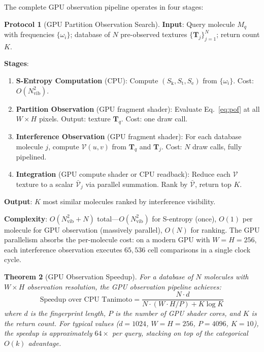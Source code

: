 \documentclass[11pt,twocolumn,a4paper]{article}
\newtheorem{theorem}{Theorem}[section]
\theoremstyle{definition}
\newtheorem{protocol}[theorem]{Protocol}
\theoremstyle{remark}
\newcommand{\Sk}{S_{\mathrm{k}}}
\newcommand{\St}{S_{\mathrm{t}}}
\newcommand{\Se}{S_{\mathrm{e}}}
\newcommand{\Nvib}{N_{\mathrm{vib}}}
\begin{document}
The complete GPU observation pipeline operates in four stages:

\begin{protocol}[GPU Partition Observation Search]
\label{prot:gpu_search}
\textbf{Input}: Query molecule $M_q$ with frequencies $\{\omega_i\}$; database of $N$ pre-observed textures $\{\mathbf{T}_j\}_{j=1}^N$; return count $K$.

\textbf{Stages}:
\begin{enumerate}[nosep]
\item \textbf{S-Entropy Computation} (CPU): Compute $(\Sk, \St, \Se)$ from $\{\omega_i\}$. Cost: $O(\Nvib^2)$.
\item \textbf{Partition Observation} (GPU fragment shader): Evaluate Eq.~\eqref{eq:pof} at all $W \times H$ pixels. Output: texture $\mathbf{T}_q$. Cost: one draw call.
\item \textbf{Interference Observation} (GPU fragment shader): For each database molecule $j$, compute $\mathcal{V}(u,v)$ from $\mathbf{T}_q$ and $\mathbf{T}_j$. Cost: $N$ draw calls, fully pipelined.
\item \textbf{Integration} (GPU compute shader or CPU readback): Reduce each $\mathcal{V}$ texture to a scalar $\bar{\mathcal{V}}_j$ via parallel summation. Rank by $\bar{\mathcal{V}}$, return top $K$.
\end{enumerate}

\textbf{Output}: $K$ most similar molecules ranked by interference visibility.

\textbf{Complexity}: $O(\Nvib^2 + N)$ total---$O(\Nvib^2)$ for S-entropy (once), $O(1)$ per molecule for GPU observation (massively parallel), $O(N)$ for ranking. The GPU parallelism absorbs the per-molecule cost: on a modern GPU with $W = H = 256$, each interference observation executes $65{,}536$ cell comparisons in a single clock cycle.
\end{protocol}

\begin{theorem}[GPU Observation Speedup]
\label{thm:gpu_speedup}
For a database of $N$ molecules with $W \times H$ observation resolution, the GPU observation pipeline achieves:
\begin{equation}
\text{Speedup over CPU Tanimoto} = \frac{N \cdot d}{N \cdot (W \cdot H / P) + K \log K}
\label{eq:gpu_speedup}
\end{equation}
where $d$ is the fingerprint length, $P$ is the number of GPU shader cores, and $K$ is the return count. For typical values ($d = 1024$, $W = H = 256$, $P = 4096$, $K = 10$), the speedup is approximately $64\times$ per query, stacking on top of the categorical $O(k)$ advantage.
\end{theorem}
\end{document}
